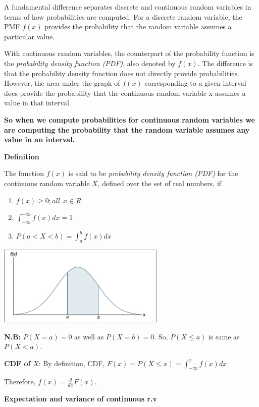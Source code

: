 \documentclass[
]{article}
\providecommand{\tightlist}{%
  \setlength{\itemsep}{0pt}\setlength{\parskip}{0pt}}
\begin{document}
A fundamental difference separates discrete and continuous random variables in terms of how probabilities are computed. For a discrete random variable, the PMF \(f(x)\) provides the probability that the random variable assumes a particular value.

With continuous random variables, the counterpart of the probability function is the \emph{probability density function (PDF)}, also denoted by \(f(x)\). The difference is that the probability density function does not directly provide probabilities. However, the area under the graph of \(f(x)\) corresponding to a given interval does provide the probability that the continuous random variable x assumes a value in that interval.

\textbf{So when we compute probabilities for continuous random variables we are computing the probability that the random variable assumes any value in an interval.}

\textbf{Definition}

The function \(f(x)\) is said to be \emph{probability density function (PDF)} for the continuous random variable \(X\), defined over the set of real numbers, if

\begin{enumerate}
\def\labelenumi{\arabic{enumi}.}
\tightlist
\item
  \(f(x)\ge0; all\ \ x\in R\)
\item
  \(\int_{-\infty}^{+\infty} f(x)dx=1\)
\item
  \(P(a< X < b)=\int_{a}^{b} f(x)dx\)
\end{enumerate}

\includegraphics[width=0.6\textwidth,height=\textheight]{PDF.png}

\textbf{N.B:} \(P(X=a)=0\) as well as \(P(X=b)=0\). So, \(P(X\le a )\) is same as \(P(X<a)\).

\textbf{CDF of} \(X\): By definition, CDF, \(F(x)=P(X\le x)= \int_{-\infty}^{x} f(x)dx\)

Therefore, \(f(x)=\frac{d}{dx} F(x)\).

\textbf{Expectation and variance of continuous r.v}
\end{document}
